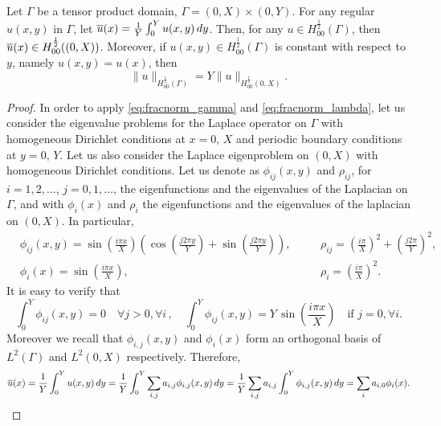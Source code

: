 
\begin{lemma}\label{lemma:H12norm}
Let $\Gamma$ be a tensor product domain, $\Gamma= (0,X) \times (0,Y)$. For any regular $u(x,y)$ in $\Gamma$, let $\overline{u}(x)=\frac 1Y \int _0^Y u(x,y)\, dy$. Then, for any $u\in H_{00}^{\frac 12}(\Gamma)$, then $\overline{u}(x)\in H_{00}^{\frac 12}((0,X))$. 
Moreover, if $u(x,y)\in H^{\frac 12}_{00}(\Gamma)$ is constant with respect to $y$, namely $u(x,y)=u(x)$, then 
\begin{equation*}
\|u\|_{H^{\frac 12}_{00}(\Gamma)}=Y \|u\|_{H^{\frac 12}_{00}(0,X)}.
\end{equation*}
\end{lemma}
\begin{proof}
In order to apply \eqref{eq:fracnorm_gamma} and \eqref{eq:fracnorm_lambda}, let us consider the eigenvalue problems for the Laplace operator on $\Gamma$ with homogeneous Dirichlet conditions at $x=0,\, X$ and periodic boundary conditions at $y=0,\, Y$. Let us also consider the Laplace eigenproblem on $(0,X)$ with homogeneous Dirichlet conditions. Let us denote as $\phi _{ij}(x,y)$ and $\rho _{ij}$, for $i=1,2,\dots$, $j=0,1,\dots$, the eigenfunctions and the eigenvalues of the Laplacian on $\Gamma$, and with $\phi _i(x)$ and $\rho _i$ the eigenfunctions and the eigenvalues of the laplacian on $(0,X)$. In particular,
\begin{align*}
&\phi _{ij}(x,y)=\sin \left(\frac{i\pi x}{X}\right)\left( \cos\left(\frac{j2\pi y}{Y}\right)+ \sin\left(\frac{j2\pi y}{Y}\right) \right),\quad
&&\rho_{ij}=\left(\frac{i\pi}{X}\right) ^2+\left(\frac{j2\pi}{Y}\right)^2,
\\
&\phi _{i}(x)=\sin \left(\frac{i\pi x}{X}\right),\quad
&&\rho _i = \left(\frac{i\pi}{X}\right) ^2.
\end{align*}
It is easy to verify that 
\begin{equation}\label{int_eigenf}
\int_0^{Y} \phi _{ij}(x,y)=0 \quad \forall j>0, \forall i\,,
\quad
\int_0^{Y} \phi _{ij}(x,y)= Y \, \sin\left(\frac{i\pi x}{X}\right) \quad \mbox{if } j=0, \forall i  .
\end{equation}
Moreover we recall that $\phi_{i,j}(x,y)$ and $\phi _i(x)$ form an orthogonal basis of $L^2(\Gamma)$ and $L^2(0,X)$ respectively. Therefore,
\begin{equation*}
\overline{u}(x)=\frac{1}{Y}\int_0^{Y} u(x,y)\, dy
= \frac{1}{Y}\int_0^{Y} \sum_{i,j} a_{i,j} \phi_{i,j}(x,y) \, dy
= \frac{1}{Y}\sum_{i,j} a_{i,j}\int_0^{Y}  \phi_{i,j}(x,y) \, dy
=  \sum_{i} a_{i,0} \phi_{i}(x).
\end{equation*}


\end{proof}
